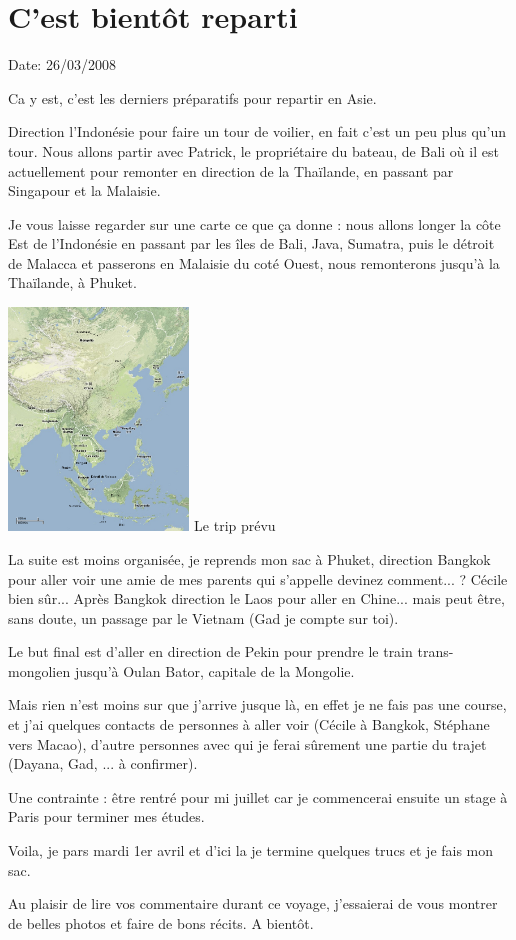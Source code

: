 \section{C'est bientôt reparti}

Date: 26/03/2008

\begin{multicols}{2}

Ca y est, c'est les derniers préparatifs pour repartir en Asie.

Direction l'Indonésie pour faire un tour de voilier, en fait c'est un peu plus qu'un tour. Nous allons partir avec Patrick, le propriétaire du bateau, de Bali où il est actuellement pour remonter en direction de la Thaïlande, en passant par Singapour et la Malaisie.

Je vous laisse regarder sur une carte ce que ça donne : nous allons longer la côte Est de l'Indonésie en passant par les îles de Bali, Java, Sumatra, puis le détroit de Malacca et passerons en Malaisie du coté Ouest, nous remonterons jusqu'à la Thaïlande, à Phuket.

\hspace*{-0.65cm}
\includegraphics[width=4.8cm]{articles/C-est-bientot-reparti/trip.png}
Le trip prévu

La suite est moins organisée, je reprends mon sac à Phuket, direction Bangkok pour aller voir une amie de mes parents qui s'appelle devinez comment... ? Cécile bien sûr... Après Bangkok direction le Laos pour aller en Chine... mais peut être, sans doute, un passage par le Vietnam (Gad je compte sur toi).

Le but final est d'aller en direction de Pekin pour prendre le train trans-mongolien jusqu'à Oulan Bator, capitale de la Mongolie.

Mais rien n'est moins sur que j'arrive jusque là, en effet je ne fais pas une course, et j'ai quelques contacts de personnes à aller voir (Cécile à Bangkok, Stéphane vers Macao), d'autre personnes avec qui je ferai sûrement une partie du trajet (Dayana, Gad, ... à confirmer).

Une contrainte : être rentré pour mi juillet car je commencerai ensuite un stage à Paris pour terminer mes études.

Voila, je pars mardi 1er avril et d'ici la je termine quelques trucs et je fais mon sac.

Au plaisir de lire vos commentaire durant ce voyage, j'essaierai de vous montrer de belles photos et faire de bons récits. A bientôt.

\end{multicols}
